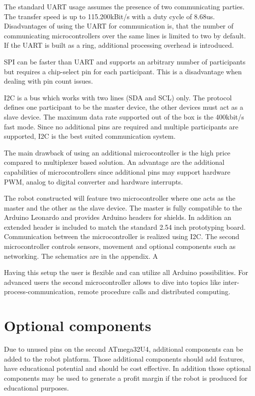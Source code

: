 The standard UART usage assumes the presence of two communicating parties. The transfer speed is up to 115.200kBit/s with a duty cycle of 8.68us. Disadvantages of using the UART for communication is, that the number of communicating microcontrollers over the same lines is limited to two by default. If the UART is built as a ring, additional processing overhead is introduced. 

SPI can be faster than UART and supports an arbitrary number of participants but requires a chip-select pin for each participant. This is a disadvantage when dealing with pin count issues.

I2C is a bus which works with two lines (SDA and SCL) only. The protocol defines one participant to be the master device, the other devices must act as a slave device. The maximum data rate supported out of the box is the 400kbit/s fast mode. Since no additional pins are required and multiple participants are supported, I2C is the best suited communication system.

The main drawback of using an additional microcontroller is the high price compared to multiplexer based solution. An advantage are the additional capabilities of microcontrollers since additional pins may support hardware PWM, analog to digital converter and hardware interrupts.  

The robot constructed will feature two microcontroller where one acts as the master and the other as the slave device. The master is fully compatible to the Arduino Leonardo and provides Arduino headers for shields. In addition an extended header is included to match the standard 2.54 inch prototyping board. Communication between the microcontroller is realized using I2C. The second microcontroller controls sensors, movement and optional components such as networking. The schematics are in the appendix. A 

Having this setup the user is flexible and can utilize all Arduino possibilities. For advanced users the second microcontroller allows to dive into topics like inter-process-communication, remote procedure calls and distributed computing.  

\section{Optional components}
Due to unused pins on the second ATmega32U4, additional components can be added to the robot platform. Those additional components should add features, have educational potential and should be cost effective. In addition those optional components may be used to generate a profit margin if the robot is produced for educational purposes.

